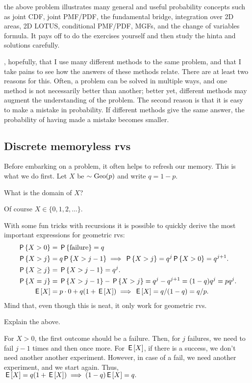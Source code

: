  the above problem illustrates many general and useful probability concepts such as  joint CDF, joint PMF/PDF, the fundamental bridge, integration over 2D areas, 2D LOTUS, conditional PMF/PDF, MGFs, and the change of variables formula. It pays off to do the exercises yourself and then study the hinta and solutions carefully.

, hopefully, that I use many different methods to the same problem, and that I take pains to see how the answers of these methods relate. There are at least two reasons for this. Often, a problem can be solved in multiple ways, and one method is not necessarily better than another; better yet,  different methods may augment the understanding of the problem. The second reason is that it is easy to make a mistake in probability. If  different methods give the same answer, the probability of having made a mistake becomes smaller.

\subsection{Discrete memoryless rvs} \label{sec:set-1}

Before  embarking on a problem, it often helps to  refresh our memory. This is what we do first.
Let $X$ be $\sim \mathrm{Geo}(p)$ and write $q = 1-p$.

\begin{exercise}
What is the domain of $X$?
\begin{solution}
Of course $X \in \{0, 1, 2, \ldots\}$.
\end{solution}
\end{exercise}

With some fun tricks with recursions it is possible to quickly derive the most important expressions for geometric rvs:
\begin{align*}
\,\mathsf{P}\left\{X>0\right\} &= \,\mathsf{P}\left\{\textrm{failure}\right\} = q\\
\,\mathsf{P}\left\{X>j\right\} &= q \,\mathsf{P}\left\{X>j-1\right\} \implies \,\mathsf{P}\left\{X>j\right\}=q^{j}\,\mathsf{P}\left\{X>0\right\} = q^{j+1}.\\
\,\mathsf{P}\left\{X\geq j\right\} &=  \,\mathsf{P}\left\{X>j-1\right\} = q^{j}.\\
\,\mathsf{P}\left\{X=j\right\} &= \,\mathsf{P}\left\{X>j-1\right\} - \,\mathsf{P}\left\{X>j\right\} = q^{j}-q^{j+1} = (1-q)q^{j} = p q^{j}.\\
\,\mathsf{E}\left[X\right] &= p\cdot 0 + q(1+\,\mathsf{E}\left[X\right]) \implies \,\mathsf{E}\left[X\right] = q/(1-q) = q/p.
\end{align*}
Mind that, even though this is neat, it only work for geometric rvs.

\begin{exercise}
Explain the above.
\begin{solution}
For $X>0$, the first outcome should be a failure. Then, for $j$ failures, we need to fail $j-1$ times and then once more. For $\,\mathsf{E}\left[X\right]$, if there is a success, we don't need another another experiment. However, in case of a fail, we need another experiment, and we start again. Thus, $\,\mathsf{E}\left[X\right] = q(1+\,\mathsf{E}\left[X\right]) \implies (1-q)\,\mathsf{E}\left[X\right] = q.$
\end{solution}
\end{exercise}

